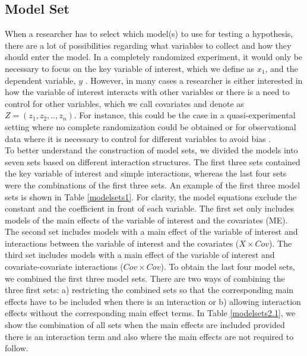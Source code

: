 \subsection{Model Set}
When a researcher has to select which model(s) to use for testing a hypothesis, there are a lot of possibilities regarding what variables to collect and how they should enter the model. In a completely randomized experiment, it would only be necessary to focus on the key variable of interest, which we define as $x_1$, and the dependent variable, $y$ \citep{angrist2008mostly}. However, in many cases a researcher is either interested in how the variable of interest interacts with other variables or there is a need to control for other variables, which we call covariates and denote as $Z=(z_1,z_2,..,z_n)$. For instance, this could be the case in a quasi-experimental setting where no complete randomization could be obtained or for observational data where it is necessary to control for different variables to avoid bias \citep{angrist2008mostly}. \\ 
To better understand the construction of model sets, we divided the models into seven sets based on different interaction structures. The first three sets contained the key variable of interest and simple interactions, whereas the last four sets were the combinations of the first three sets. An example of the first three model sets is shown in Table \ref{modelsets1}. For clarity, the model equations exclude the constant and the coefficient in front of each variable. The first set only includes models of the main effects of the variable of interest and the covariates (ME). The second set includes models with a main effect of the variable of interest and interactions between the variable of interest and the covariates ($X \times Cov$). The third set includes models with a main effect of the variable of interest and covariate-covariate interactions ($Cov \times Cov$).
To obtain the last four model sets, we combined the first three model sets. There are two ways of combining the three first sets: a) restricting the combined sets so that the corresponding main effects have to be included when there is an interaction or b) allowing interaction effects without the corresponding main effect terms. In Table \ref{modelsets2.1}, we show the combination of all sets when the main effects are included provided there is an interaction term and also where the main effects are not required to follow. \\
 



